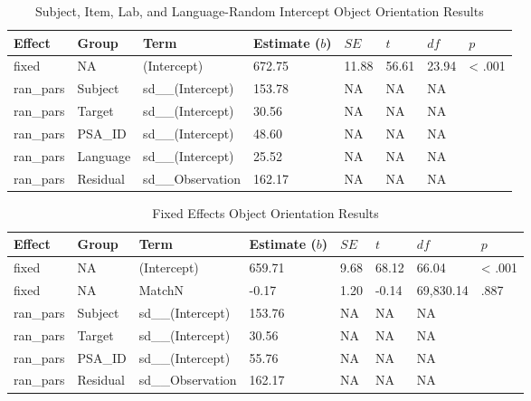 \documentclass[
  man,mask,floatsintext]{apa7}
\begin{document}
\begin{table}[tbp]

\begin{center}
\begin{threeparttable}

\caption{\label{tab:lang}Subject, Item, Lab, and Language-Random Intercept Object Orientation Results}

\begin{tabular}{llllllll}
\toprule
Effect & Group & Term & Estimate ($b$) & $SE$ & $t$ & $df$ & $p$\\
\midrule
fixed & NA & (Intercept) & 672.75 & 11.88 & 56.61 & 23.94 & < .001\\
ran\_pars & Subject & sd\_\_(Intercept) & 153.78 & NA & NA & NA & \\
ran\_pars & Target & sd\_\_(Intercept) & 30.56 & NA & NA & NA & \\
ran\_pars & PSA\_ID & sd\_\_(Intercept) & 48.60 & NA & NA & NA & \\
ran\_pars & Language & sd\_\_(Intercept) & 25.52 & NA & NA & NA & \\
ran\_pars & Residual & sd\_\_Observation & 162.17 & NA & NA & NA & \\
\bottomrule
\end{tabular}

\end{threeparttable}
\end{center}

\end{table}

\begin{table}[tbp]

\begin{center}
\begin{threeparttable}

\caption{\label{tab:fixed}Fixed Effects Object Orientation Results}

\begin{tabular}{llllllll}
\toprule
Effect & Group & Term & Estimate ($b$) & $SE$ & $t$ & $df$ & $p$\\
\midrule
fixed & NA & (Intercept) & 659.71 & 9.68 & 68.12 & 66.04 & < .001\\
fixed & NA & MatchN & -0.17 & 1.20 & -0.14 & 69,830.14 & .887\\
ran\_pars & Subject & sd\_\_(Intercept) & 153.76 & NA & NA & NA & \\
ran\_pars & Target & sd\_\_(Intercept) & 30.56 & NA & NA & NA & \\
ran\_pars & PSA\_ID & sd\_\_(Intercept) & 55.76 & NA & NA & NA & \\
ran\_pars & Residual & sd\_\_Observation & 162.17 & NA & NA & NA & \\
\bottomrule
\end{tabular}

\end{threeparttable}
\end{center}

\end{table}
\end{document}
